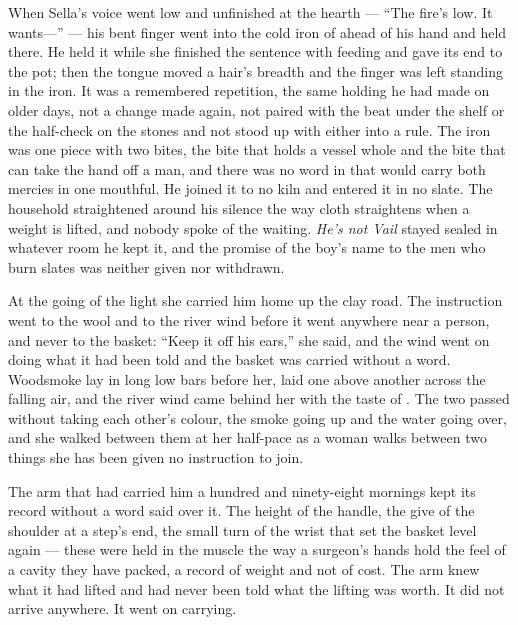 When Sella's voice went low and unfinished at the hearth --- “The fire's low. It wants---” --- his bent finger went into the cold iron of  ahead of his hand and held there. He held it while she finished the sentence with feeding and gave its end to the pot; then the tongue moved a hair's breadth and the finger was left standing in the iron. It was a remembered repetition, the same holding he had made on older days, not a change made again, not paired with the beat under the shelf or the half-check on the stones and not stood up with either into a rule. The iron was one piece with two bites, the bite that holds a vessel whole and the bite that can take the hand off a man, and there was no word in  that would carry both mercies in one mouthful. He joined it to no kiln and entered it in no slate. The household straightened around his silence the way cloth straightens when a weight is lifted, and nobody spoke of the waiting. \emph{He's not Vail} stayed sealed in whatever room he kept it, and the promise of the boy's name to the men who burn slates was neither given nor withdrawn.

\scenebreak

At the going of the light she carried him home up the clay road. The instruction went to the wool and to the river wind before it went anywhere near a person, and never to the basket: “Keep it off his ears,” she said, and the wind went on doing what it had been told and the basket was carried without a word. Woodsmoke lay in long low bars before her, laid one above another across the falling air, and the river wind came behind her with the taste of . The two passed without taking each other's colour, the smoke going up and the water going over, and she walked between them at her half-pace as a woman walks between two things she has been given no instruction to join.

The arm that had carried him a hundred and ninety-eight mornings kept its record without a word said over it. The height of the handle, the give of the shoulder at a step's end, the small turn of the wrist that set the basket level again --- these were held in the muscle the way a surgeon's hands hold the feel of a cavity they have packed, a record of weight and not of cost. The arm knew what it had lifted and had never been told what the lifting was worth. It did not arrive anywhere. It went on carrying.

